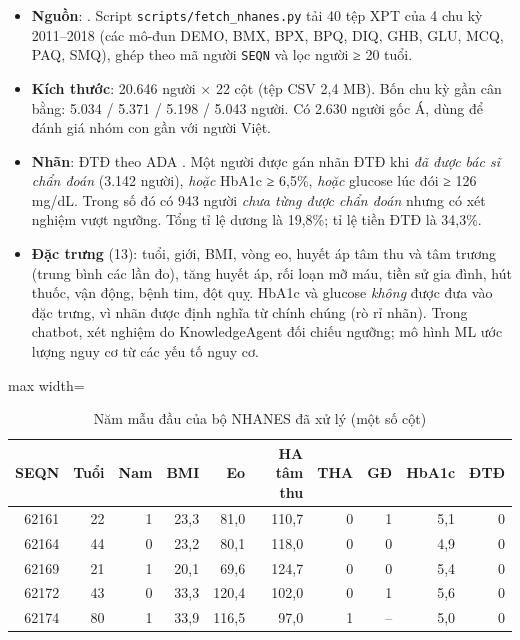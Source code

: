 \begin{itemize}
  \item \textbf{Nguồn}: . Script \texttt{scripts/fetch\_nhanes.py} tải 40 tệp XPT của 4 chu kỳ 2011–2018 (các mô-đun DEMO, BMX, BPX, BPQ, DIQ, GHB, GLU, MCQ, PAQ, SMQ), ghép theo mã người \texttt{SEQN} và lọc người ≥ 20 tuổi.
  \item \textbf{Kích thước}: 20.646 người × 22 cột (tệp CSV 2,4 MB). Bốn chu kỳ gần cân bằng: 5.034 / 5.371 / 5.198 / 5.043 người. Có 2.630 người gốc Á, dùng để đánh giá nhóm con gần với người Việt.
  \item \textbf{Nhãn}: ĐTĐ theo ADA \cite{ada2024}. Một người được gán nhãn ĐTĐ khi \emph{đã được bác sĩ chẩn đoán} (3.142 người), \emph{hoặc} HbA1c ≥ 6,5\%, \emph{hoặc} glucose lúc đói ≥ 126 mg/dL. Trong số đó có 943 người \emph{chưa từng được chẩn đoán} nhưng có xét nghiệm vượt ngưỡng. Tổng tỉ lệ dương là 19,8\%; tỉ lệ tiền ĐTĐ là 34,3\%.
  \item \textbf{Đặc trưng} (13): tuổi, giới, BMI, vòng eo, huyết áp tâm thu và tâm trương (trung bình các lần đo), tăng huyết áp, rối loạn mỡ máu, tiền sử gia đình, hút thuốc, vận động, bệnh tim, đột quỵ. HbA1c và glucose \emph{không} được đưa vào đặc trưng, vì nhãn được định nghĩa từ chính chúng (rò rỉ nhãn). Trong chatbot, xét nghiệm do KnowledgeAgent đối chiếu ngưỡng; mô hình ML ước lượng nguy cơ từ các yếu tố nguy cơ.
\end{itemize}

\begin{table}[H]
\centering
\caption{Năm mẫu đầu của bộ NHANES đã xử lý (một số cột)}
\label{tab:nhanes-head}
\small
\begin{adjustbox}{max width=\linewidth}
\begin{tabular}{@{}rrrrrrrrrr@{}}
\toprule
\textbf{SEQN} & \textbf{Tuổi} & \textbf{Nam} & \textbf{BMI} & \textbf{Eo} & \textbf{HA tâm thu} & \textbf{THA} & \textbf{GĐ} & \textbf{HbA1c} & \textbf{ĐTĐ} \\
\midrule
62161 & 22 & 1 & 23,3 & 81,0 & 110,7 & 0 & 1 & 5,1 & 0 \\
62164 & 44 & 0 & 23,2 & 80,1 & 118,0 & 0 & 0 & 4,9 & 0 \\
62169 & 21 & 1 & 20,1 & 69,6 & 124,7 & 0 & 0 & 5,4 & 0 \\
62172 & 43 & 0 & 33,3 & 120,4 & 102,0 & 0 & 1 & 5,6 & 0 \\
62174 & 80 & 1 & 33,9 & 116,5 & 97,0 & 1 & -- & 5,0 & 0 \\
\bottomrule
\end{tabular}
\end{adjustbox}
\end{table}

